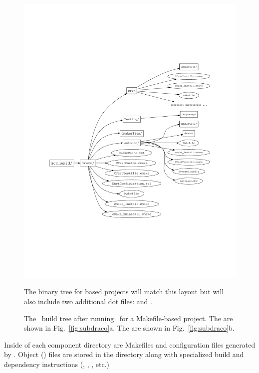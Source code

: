 \begin{figure}
  \centerline{\includegraphics[width=6in]{fig/build_tree}}
  \caption{The \draco\ build tree after running \cmake\ for a Makefile-based project.  The  are shown in
    Fig.~\ref{fig:subdraco}a. The  are shown in
    Fig.~\ref{fig:subdraco}b.}  The binary tree for  based projects will match this layout but will also include two additional dot files:  and .
  \label{fig:build_tree}
\end{figure}
Inside of each component directory are Makefiles and configuration files
generated by \cmake.  Object () files are stored in the  directory along with specialized build and dependency instructions (, , , etc.)

